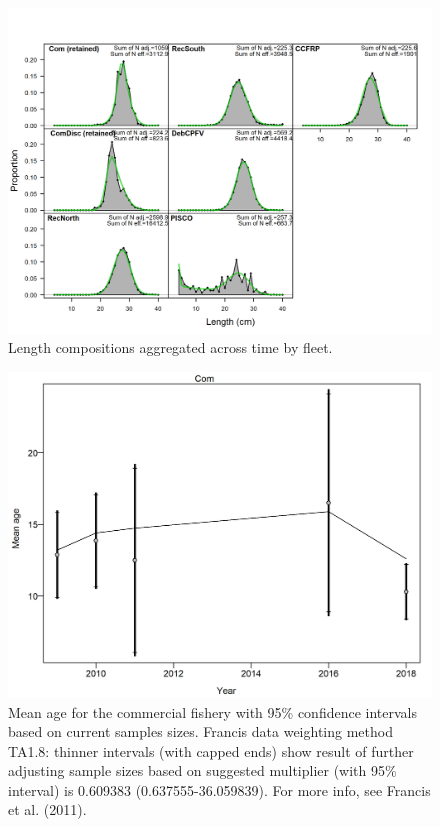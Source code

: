 \documentclass[12pt,]{article}
\begin{document}
\FloatBarrier 

\begin{figure}
\centering
\includegraphics{r4ss/plots_mod1/comp_lenfit__aggregated_across_time.png}
\caption{Length compositions aggregated across time by fleet.
\label{fig:comp_lenfit__aggregated_across_time}}
\end{figure}

\FloatBarrier

\begin{figure}
\centering
\includegraphics{r4ss/plots_mod1/comp_condAALfit_data_weighting_TA1.8_condAgeCom.png}
\caption{Mean age for the commercial fishery with 95\% confidence
intervals based on current samples sizes. Francis data weighting method
TA1.8: thinner intervals (with capped ends) show result of further
adjusting sample sizes based on suggested multiplier (with 95\%
interval) is 0.609383 (0.637555-36.059839). For more info, see Francis
et al. (2011).
\label{fig:comp_condAALfit_data_weighting_TA1.8_condAgeCom}}
\end{figure}
\end{document}
